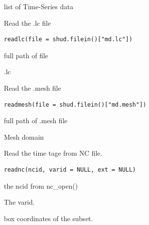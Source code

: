 \documentclass[a4paper]{book}
\begin{document}
%
\begin{Value}
list of Time-Series data
\end{Value}
%
\begin{Description}\relax
Read the .lc file
\end{Description}
%
\begin{Usage}
\begin{verbatim}
readlc(file = shud.filein()["md.lc"])
\end{verbatim}
\end{Usage}
%
\begin{Arguments}
\begin{ldescription}
\item[\code{file}] full path of file
\end{ldescription}
\end{Arguments}
%
\begin{Value}
.lc
\end{Value}
%
\begin{Description}\relax
Read the .mesh file
\end{Description}
%
\begin{Usage}
\begin{verbatim}
readmesh(file = shud.filein()["md.mesh"])
\end{verbatim}
\end{Usage}
%
\begin{Arguments}
\begin{ldescription}
\item[\code{file}] full path of .mesh file
\end{ldescription}
\end{Arguments}
%
\begin{Value}
Mesh domain
\end{Value}
%
\begin{Description}\relax
Read the time tage from NC file.
\end{Description}
%
\begin{Usage}
\begin{verbatim}
readnc(ncid, varid = NULL, ext = NULL)
\end{verbatim}
\end{Usage}
%
\begin{Arguments}
\begin{ldescription}
\item[\code{ncid}] the ncid from nc\_open()

\item[\code{varid}] The varid.

\item[\code{ext}] box coordinates of the subset.
\end{ldescription}
\end{Arguments}
\end{document}
